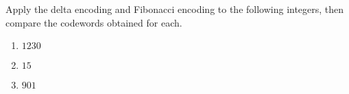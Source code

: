 \documentclass{subfiles}
\begin{document}
    \begin{exercise}
        Apply the delta encoding and Fibonacci encoding to the following integers,
            then compare the codewords obtained for each.
        \begin{enumerate}
            \item \(1230\)
            \item \(15\)
            \item \(901\)
        \end{enumerate}
    \end{exercise}
    \clearpage
\end{document}
